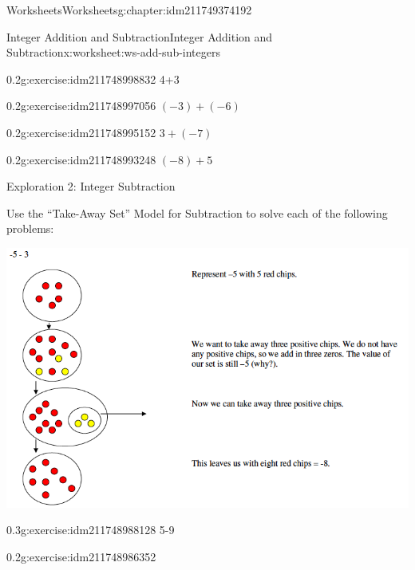 \documentclass[twoside,11pt,]{book}
\begin{document}
\begin{chapterptx}{Worksheets}{}{Worksheets}{}{}{g:chapter:idm211749374192}
\begin{worksheet-section-numberless}{Integer Addition and Subtraction}{}{Integer Addition and Subtraction}{}{}{x:worksheet:ws-add-sub-integers}
\begin{introduction}{}
\begin{sidebyside}{1}{0}{0}{0}
\begin{sbspanel}{1}
\end{sbspanel}%
\end{sidebyside}%
%
\end{introduction}%
\begin{divisionexercise}{1}{}{0.2}{g:exercise:idm211748998832}%
4+3%
\end{divisionexercise}%
\clearpage
\begin{divisionexercise}{2}{}{0.2}{g:exercise:idm211748997056}%
\((-3)+(-6) \)%
\end{divisionexercise}%
\begin{divisionexercise}{3}{}{0.2}{g:exercise:idm211748995152}%
\(3+(-7) \)%
\end{divisionexercise}%
\begin{divisionexercise}{4}{}{0.2}{g:exercise:idm211748993248}%
\((-8)+ 5 \)%
\end{divisionexercise}%
\clearpage
\begin{introduction}{}%
Exploration 2: Integer Subtraction%
\par
Use the ``Take-Away Set'' Model for Subtraction to solve each of the following problems: \begin{sidebyside}{1}{0}{0}{0}%
\begin{sbspanel}{1}%
\includegraphics[width=1\linewidth]{images/integer-sub-model.png}
\end{sbspanel}%
\end{sidebyside}%
%
\end{introduction}%
\begin{divisionexercise}{5}{}{0.3}{g:exercise:idm211748988128}%
5-9%
\end{divisionexercise}%
\clearpage
\begin{divisionexercise}{6}{}{0.2}{g:exercise:idm211748986352}%

\end{divisionexercise}
\end{worksheet-section-numberless}
\end{chapterptx}
\end{document}
